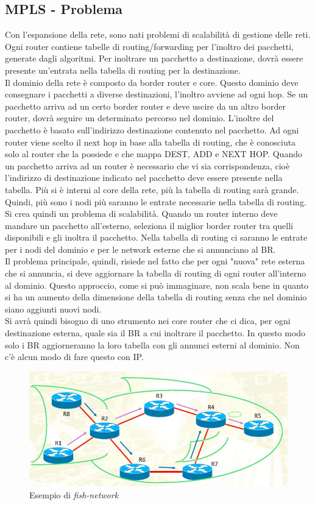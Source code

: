 \documentclass{article}
\begin{document}
\subsection{MPLS - Problema}
Con l'espansione della rete, sono nati problemi di scalabilità di gestione delle reti. Ogni router contiene tabelle di routing/forwarding per l'inoltro dei pacchetti, generate dagli algoritmi. Per inoltrare un pacchetto a destinazione, dovrà essere presente un'entrata nella tabella di routing per la destinazione. \\ Il dominio della rete è composto da border router e core. Questo dominio deve consegnare i pacchetti a diverse destinazioni, l'inoltro avviene ad ogni hop. Se un pacchetto arriva ad un certo border router e deve uscire da un altro border router, dovrà seguire un determinato percorso nel dominio. L'inoltre del pacchetto è basato sull'indirizzo destinazione contenuto nel pacchetto. Ad ogni router viene scelto il next hop in base alla tabella di routing, che è conosciuta solo al router che la possiede e che mappa DEST, ADD e NEXT HOP. Quando un pacchetto arriva ad un router è necessario che vi sia corrispondenza, cioè l'indirizzo di destinazione indicato nel pacchetto deve essere presente nella tabella. Più si è interni al core della rete, più la tabella di routing sarà grande. \\ Quindi, più sono i nodi più saranno le entrate necessarie nella tabella di routing. Si crea quindi un problema di scalabilità. Quando un router interno deve mandare un pacchetto all'esterno, seleziona il miglior border router tra quelli disponibili e gli inoltra il pacchetto. Nella tabella di routing ci saranno le entrate per i nodi del dominio e per le network esterne che si annunciano al BR. \\ Il problema principale, quindi, risiede nel fatto che per ogni "nuova" rete esterna che si annuncia, si deve aggiornare la tabella di routing di ogni router all'interno al dominio. Questo approccio, come si può immaginare, non scala bene in quanto si ha un aumento della dimensione della tabella di routing senza che nel dominio siano aggiunti nuovi nodi. \\ Si avrà quindi bisogno di uno strumento nei core router che ci dica, per ogni destinazione esterna, quale sia il BR a cui inoltrare il pacchetto. In questo modo solo i BR aggiorneranno la loro tabella con gli annunci esterni al dominio. Non c'è alcun modo di fare questo con IP.
\begin{figure}[H]
    \centering
    \includegraphics[scale=0.6]{figures/fish.jpg}
    \caption{Esempio di \textit{fish-network}}
\end{figure}
\end{document}
